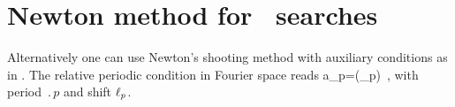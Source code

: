 

\section{Newton method  for \rpo\ searches}
\label{sec:NewtRPOs}

Alternatively one can use Newton's shooting method with auxiliary conditions as in .
The relative periodic condition in Fourier space reads
\beq
    a_p=(\shift_p)  
\,,
    \label{eq:RPOcond}
\eeq
with period $\period{p}$ and shift $\ell_p$.

